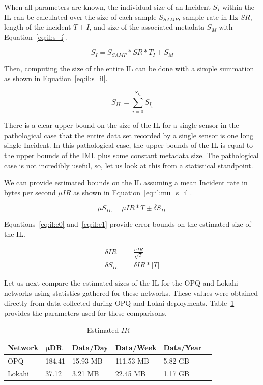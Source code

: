 When all parameters are known, the individual size of an Incident $S_{I}$ within the IL can be calculated over the size of each sample $S_{SAMP}$, sample rate in Hz $SR$, length of the incident $T+{I}$, and size of the associated metadata $S_{M}$ with Equation~\ref{eq:il:s_i}.

\begin{equation}\label{eq:il:s_i}
	S_{I} = S_{SAMP} * SR * T_{I} + S_{M}
\end{equation}

Then, computing the size of the entire IL can be done with a simple summation as shown in Equation~\ref{eq:il:s_il}.

\begin{equation}\label{eq:il:s_il}
	S_{IL} = \sum_{i=0}^{S_{I_{n}}} S_{I_{i}}
\end{equation}

There is a clear upper bound on the size of the IL for a single sensor in the pathological case that the entire data set recorded by a single sensor is one long single Incident. In this pathological case, the upper bounds of the IL is equal to the upper bounds of the IML plus some constant metadata size. The pathological case is not incredibly useful, so, let us look at this from a statistical standpoint.

We can provide estimated bounds on the IL assuming a mean Incident rate in bytes per second $\mu IR$ as shown in Equation~\ref{eq:il:mu_s_il}.

\begin{equation}\label{eq:il:mu_s_il}
 \mu S_{IL} = \mu IR * T \pm \delta S_{IL}
\end{equation}

Equations~\ref{eq:il:e0} and~\ref{eq:il:e1} provide error bounds on the estimated size of the IL\@.

\begin{align}
	\delta IR &= \frac{\sigma IR}{\sqrt{T}} \label{eq:il:e0} \\
	\delta S_{IL} &= \delta IR * |T| \label{eq:il:e1}
\end{align}

Let us next compare the estimated sizes of the IL for the OPQ and Lokahi networks using statistics gathered for these networks. These values were obtained directly from data collected during OPQ and Lokai deployments. Table~\ref{table:estimated_mu_ir} provides the parameters used for these comparisons.

\begin{table}[H]
	\centering
	\caption{Estimated $IR$}
	\begin{tabularx}{\textwidth}{llllll}
		\toprule
		\textbf{Network} & $\bm{\mu DR}$ & \textbf{Data/Day} & \textbf{Data/Week} & \textbf{Data/Year} \\
		\midrule
		OPQ & 184.41 & 15.93 MB & 111.53 MB & 5.82 GB \\
		Lokahi & 37.12 & 3.21 MB & 22.45 MB & 1.17 GB \\
		\bottomrule
	\end{tabularx}
	\label{table:estimated_mu_ir}
\end{table}

